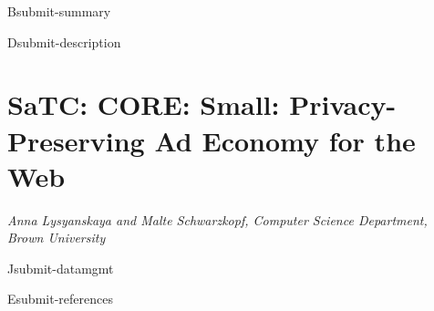 \documentclass[11pt]{article}
\newcommand{\proptitle}{Privacy-Preserving Ad Economy for the Web}
\newcommand{\authoraffil}{Anna Lysyanskaya and Malte Schwarzkopf, Computer Science Department, Brown University}
\begin{document}
\pagestyle{plain}

\begin{submit}{B}{submit-summary}

\end{submit}


\begin{submit}{D}{submit-description}

\section*{SaTC: CORE: Small: \proptitle{}}
{\em\authoraffil}
\medskip




%
%
%


\end{submit}

%

\begin{submit}{J}{submit-datamgmt}

\end{submit}

%

%

%

\begin{submit}{E}{submit-references}
{

\renewcommand{\refname}{{E}\quad References Cited}
\raggedright
%
%
\printbibliography

}
\end{submit}
\end{document}

